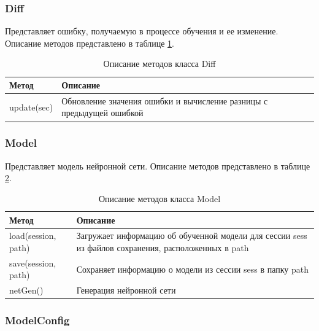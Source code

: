 \subsubsection*{Diff}

Представляет ошибку, получаемую в процессе обучения и ее изменение. Описание методов представлено в таблице \ref{imp:diff}.

\begin{table}[h]
	\caption{\label{imp:diff}Описание методов класса Diff}
	\begin{center}
		\begin{tabular}{|p{}|p{}|}
			\hline
			Метод & Описание \\
			\hline
			update(sec) & Обновление значения ошибки и вычисление разницы с предыдущей ошибкой \\	
			\hline
		\end{tabular}
	\end{center}
\end{table} 

\subsubsection*{Model}

Представляет модель нейронной сети. Описание методов представлено в таблице \ref{imp:model}.

\begin{table}[h]
	\caption{\label{imp:model}Описание методов класса Model}
	\begin{center}
		\begin{tabular}{|p{}|p{}|}
			\hline
			Метод & Описание \\
			\hline
			load(session, path) & Загружает информацию об обученной модели для сессии sess из файлов сохранения, расположенных в path \\	
			\hline
			save(session, path) & Сохраняет информацию о модели из сессии sess в папку path \\
			\hline
			netGen() & Генерация нейронной сети \\
			\hline
		\end{tabular}
	\end{center}
\end{table} 

\subsubsection*{ModelConfig}

